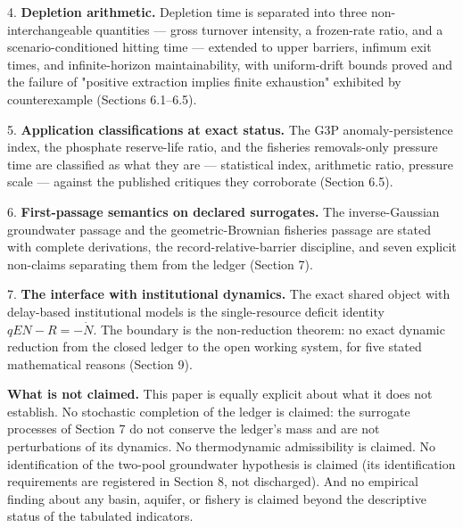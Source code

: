 \documentclass[11pt]{article}
\begin{document}
4. \textbf{Depletion arithmetic.} Depletion time is separated into three non-interchangeable quantities --- gross turnover intensity, a frozen-rate ratio, and a scenario-conditioned hitting time --- extended to upper barriers, infimum exit times, and infinite-horizon maintainability, with uniform-drift bounds proved and the failure of "positive extraction implies finite exhaustion" exhibited by counterexample (Sections 6.1--6.5).

5. \textbf{Application classifications at exact status.} The G3P anomaly-persistence index, the phosphate reserve-life ratio, and the fisheries removals-only pressure time are classified as what they are --- statistical index, arithmetic ratio, pressure scale --- against the published critiques they corroborate (Section 6.5).

6. \textbf{First-passage semantics on declared surrogates.} The inverse-Gaussian groundwater passage and the geometric-Brownian fisheries passage are stated with complete derivations, the record-relative-barrier discipline, and seven explicit non-claims separating them from the ledger (Section 7).

7. \textbf{The interface with institutional dynamics.} The exact shared object with delay-based institutional models is the single-resource deficit identity \(qEN - R = -\dot N\). The boundary is the non-reduction theorem: no exact dynamic reduction from the closed ledger to the open working system, for five stated mathematical reasons (Section 9).

\textbf{What is not claimed.} This paper is equally explicit about what it does not establish. No stochastic completion of the ledger is claimed: the surrogate processes of Section 7 do not conserve the ledger's mass and are not perturbations of its dynamics. No thermodynamic admissibility is claimed. No identification of the two-pool groundwater hypothesis is claimed (its identification requirements are registered in Section 8, not discharged). And no empirical finding about any basin, aquifer, or fishery is claimed beyond the descriptive status of the tabulated indicators.
\end{document}
